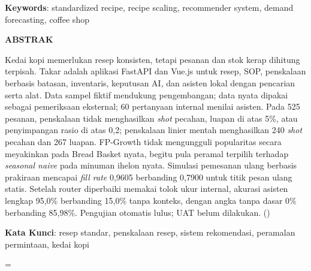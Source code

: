 \begin{singlespace}
{\vspace{0.2\baselineskip}

\noindent\textbf{Keywords}: standardized recipe, recipe scaling, recommender system, demand forecasting, coffee shop
}

\clearpage
\thispagestyle{plain}
{}

{\centering\fontsize{16}{19}\selectfont\textbf{ABSTRAK}\par}

\vspace{0.1 cm}

\noindent Kedai kopi memerlukan resep konsisten, tetapi pesanan dan stok kerap dihitung terpisah. Takar adalah aplikasi FastAPI dan Vue.js untuk resep, SOP, penskalaan berbasis batasan, inventaris, keputusan AI, dan asisten lokal dengan pencarian serta alat. Data sampel fiktif mendukung pengembangan; data nyata dipakai sebagai pemeriksaan eksternal; 60 pertanyaan internal menilai asisten. Pada 525 pesanan, penskalaan tidak menghasilkan \textit{shot} pecahan, luapan di atas 5\%, atau penyimpangan rasio di atas 0,2; penskalaan linier mentah menghasilkan 240 \textit{shot} pecahan dan 267 luapan. FP-Growth tidak mengungguli popularitas secara meyakinkan pada Bread Basket nyata, begitu pula peramal terpilih terhadap \textit{seasonal naive} pada minuman ihelon nyata. Simulasi pemesanan ulang berbasis prakiraan mencapai \textit{fill rate} 0,9605 berbanding 0,7900 untuk titik pesan ulang statis. Setelah router diperbaiki memakai tolok ukur internal, akurasi asisten lengkap 95,0\% berbanding 15,0\% tanpa konteks, dengan angka tanpa dasar 0\% berbanding 85,98\%. Pengujian otomatis lulus; UAT belum dilakukan. (\inisialPenulis)

\vspace{0.2\baselineskip}

\noindent\textbf{Kata Kunci}: resep standar, penskalaan resep, sistem rekomendasi, peramalan permintaan, kedai kopi
\end{singlespace}

\righthyphenmin=\abstrakRightHyphenMin\relax
